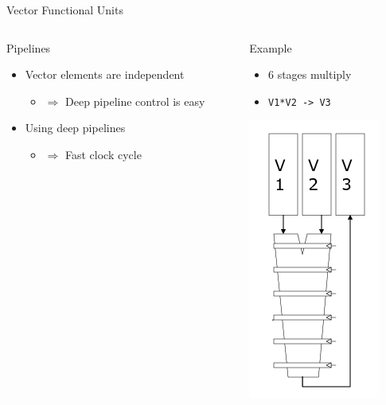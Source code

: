 \documentclass[presentation]{beamer}
\begin{document}
\begin{frame}[label={sec:orgeeeb5e9},fragile]{Vector Functional Units}
 \begin{columns}
\begin{column}{.6\columnwidth}
\begin{block}{Pipelines}
\begin{itemize}
\item Vector elements are independent
\begin{itemize}
\item \(\Rightarrow\) \alert{Deep pipeline} control is easy
\end{itemize}
\item Using deep pipelines
\begin{itemize}
\item \(\Rightarrow\) \alert{Fast clock cycle}
\end{itemize}
\end{itemize}
\end{block}
\end{column}
\begin{column}{.39\columnwidth}
\begin{block}{Example}
\begin{itemize}
\item 6 stages multiply
\item \texttt{V1*V2 -> V3}
\end{itemize}
\begin{center}
\includegraphics[width=.55\textwidth]{./images/slides_SIMD_29_small.png}
\end{center}
\end{block}
\end{column}
\end{columns}
\end{frame}
\end{document}
